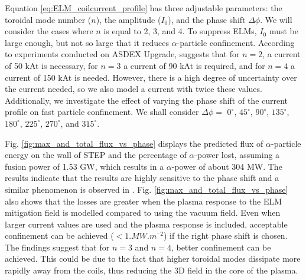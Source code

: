 \documentclass[10pt, a4paper, twoside]{article}
\begin{document}
Equation \ref{eq:ELM_coilcurrent_profile} has three adjustable parameters: the toroidal mode number ($n$), the amplitude ($I_0$), and the phase shift $\Delta \phi$. We will consider the cases where $n$ is equal to 2, 3, and 4. To suppress ELMs, $I_0$ must be large enough, but not so large that it reduces $\alpha$-particle confinement. According to experiments conducted on ASDEX Upgrade, \cite{ryan2022} suggests that for $n=2$, a current of 50 kAt is necessary, for $n=3$ a current of 90 kAt is required, and for $n=4$ a current of 150 kAt is needed. However, there is a high degree of uncertainty over the current needed, so we also model a current with twice these values. Additionally, we investigate the effect of varying the phase shift of the current profile on fast particle confinement. We shall consider $\Delta\phi =$ $0^\circ$, $45^\circ$, $90^\circ$, $135^\circ$, $180^\circ$, $225^\circ$, $270^\circ$, and $315^\circ$.

Fig. \ref{fig:max_and_total_flux_vs_phase} displays the predicted flux of $\alpha$-particle energy on the wall of STEP and the percentage of $\alpha$-power lost, assuming a fusion power of 1.53 GW, which results in a $\alpha$-power of about 304 MW. The results indicate that the results are highly sensitive to the phase shift and a similar phenomenon is observed in \cite{sanchis2018}. Fig. \ref{fig:max_and_total_flux_vs_phase} also shows that the losses are greater when the plasma response to the ELM mitigation field is modelled compared to using the vacuum field. Even when larger current values are used and the plasma response is included, acceptable confinement can be achieved ($<1\si{.MW.m^{^-2}}$) if the right phase shift is chosen. The findings suggest that for $n=3$ and $n=4$, better confinement can be achieved. This could be due to the fact that higher toroidal modes dissipate more rapidly away from the coils, thus reducing the 3D field in the core of the plasma.
\end{document}
